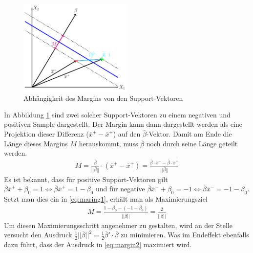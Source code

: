 \documentclass[
]{article}
\begin{document}
\begin{figure}[htb]
\centering
 \includegraphics[width=0.5\textwidth,trim=0.5cm 0.5cm 0.5cm 0.5cm]{Images/margin.pdf} 
        \caption{Abhängigkeit des Margins von den Support-Vektoren}
        \label{fig:SupVecs}
\end{figure}

In Abbildung \ref{fig:SupVecs} sind zwei solcher Support-Vektoren zu
einem negativen und positiven Sample dargestellt. Der Margin kann dann
dargestellt werden als eine Projektion dieser Differenz
(\(\overline{x}^+-\overline{x}^+\)) auf den \(\overline{\beta}\)-Vektor.
Damit am Ende die Länge dieses Margins \(M\) herauskommt, muss
\(\overline{\beta}\) noch durch seine Länge geteilt werden.
\begin{align}
M=\frac{\overline{\beta}}{||\overline{\beta}||}\cdot \left(\overline{x}^+-\overline{x}^+\right)=\frac{\overline{\beta}\cdot\overline{x}^- -\overline{\beta}\cdot\overline{x}^+}{||\overline{\beta}||}\label{eq:maring1}
\end{align} Es ist bekannt, dass für positive Support-Vektoren gilt
\(\overline\beta \overline{x}^+ +\beta_0 = 1 \Leftrightarrow \overline\beta \overline{x}^+=1-\beta_0\)
und für negative
\(\overline\beta \overline{x}^- +\beta_0 = -1 \Leftrightarrow \overline\beta \overline{x}^-=-1-\beta_0\).
Setzt man dies ein in \eqref{eq:maring1}, erhält man als
Maximierungsziel \begin{align}
M=\frac{1-\beta_0-(-1-\beta_0)}{||\overline\beta||}=\frac{2}{||\overline\beta||}\label{eq:margin2}
\end{align} Um diesen Maximierungsschritt angenehmer zu gestalten, wird
an der Stelle versucht den Ausdruck
\(\frac{1}{2}||\overline \beta||^2=\frac{1}{2}\overline \beta '\cdot \overline \beta\)
zu minimieren. Was im Endeffekt ebenfalls dazu führt, dass der Ausdruck
in \eqref{eq:margin2} maximiert wird.
\end{document}
